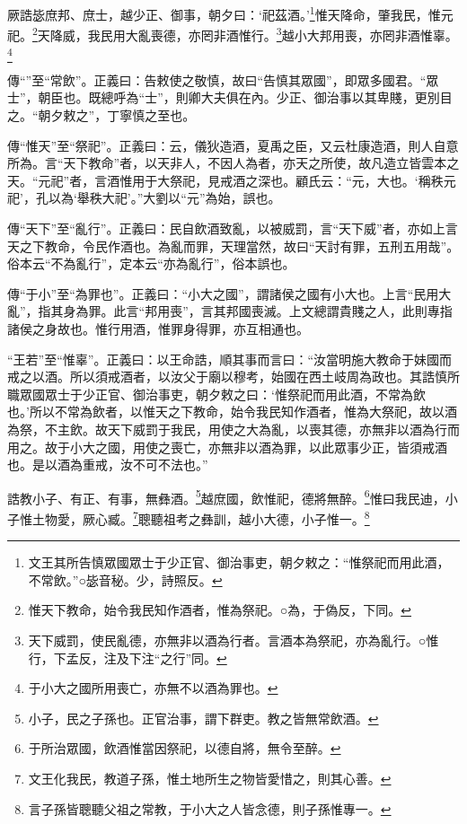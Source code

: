 厥誥毖庶邦、庶士，越少正、御事，朝夕曰：‘祀茲酒。’\footnote{文王其所告慎眾國眾士于少正官、御治事吏，朝夕敕之：“惟祭祀而用此酒，不常飲。”○毖音秘。少，詩照反。}惟天降命，肇我民，惟元祀。\footnote{惟天下教命，始令我民知作酒者，惟為祭祀。○為，于偽反，下同。}天降威，我民用大亂喪德，亦罔非酒惟行。\footnote{天下威罰，使民亂德，亦無非以酒為行者。言酒本為祭祀，亦為亂行。○惟行，下孟反，注及下注“之行”同。}越小大邦用喪，亦罔非酒惟辜。\footnote{于小大之國所用喪亡，亦無不以酒為罪也。}

{\noindent\zhuan{}\fzbyks 傳“”至“常飲”。正義曰：告敕使之敬慎，故曰“告慎其眾國”，即眾多國君。“眾士”，朝臣也。既總呼為“士”，則卿大夫俱在內。少正、御治事以其卑賤，更別目之。“朝夕敕之”，丁寧慎之至也。 \par}

{\noindent\zhuan{}\fzbyks 傳“惟天”至“祭祀”。正義曰：云，儀狄造酒，夏禹之臣，又云杜康造酒，則人自意所為。言“天下教命”者，以天非人，不因人為者，亦天之所使，故凡造立皆雲本之天。“元祀”者，言酒惟用于大祭祀，見戒酒之深也。顧氏云：“元，大也。‘稱秩元祀’，孔以為‘舉秩大祀’。”大劉以“元”為始，誤也。 \par}

{\noindent\zhuan{}\fzbyks 傳“天下”至“亂行”。正義曰：民自飲酒致亂，以被威罰，言“天下威”者，亦如上言天之下教命，令民作酒也。為亂而罪，天理當然，故曰“天討有罪，五刑五用哉”。俗本云“不為亂行”，定本云“亦為亂行”，俗本誤也。 \par}

{\noindent\zhuan{}\fzbyks 傳“于小”至“為罪也”。正義曰：“小大之國”，謂諸侯之國有小大也。上言“民用大亂”，指其身為罪。此言“邦用喪”，言其邦國喪滅。上文總謂貴賤之人，此則專指諸侯之身故也。惟行用酒，惟罪身得罪，亦互相通也。 \par}

{\noindent\shu{}\fzkt “王若”至“惟辜”。正義曰：以王命誥，順其事而言曰：“汝當明施大教命于妹國而戒之以酒。所以須戒酒者，以汝父于廟以穆考，始國在西土岐周為政也。其誥慎所職眾國眾士于少正官、御治事吏，朝夕敕之曰：‘惟祭祀而用此酒，不常為飲也。’所以不常為飲者，以惟天之下教命，始令我民知作酒者，惟為大祭祀，故以酒為祭，不主飲。故天下威罰于我民，用使之大為亂，以喪其德，亦無非以酒為行而用之。故于小大之國，用使之喪亡，亦無非以酒為罪，以此眾事少正，皆須戒酒也。是以酒為重戒，汝不可不法也。” \par}

誥教小子、有正、有事，無彝酒。\footnote{小子，民之子孫也。正官治事，謂下群吏。教之皆無常飲酒。}越庶國，飲惟祀，德將無醉。\footnote{于所治眾國，飲酒惟當因祭祀，以德自將，無令至醉。}惟曰我民迪，小子惟土物愛，厥心臧。\footnote{文王化我民，教道子孫，惟土地所生之物皆愛惜之，則其心善。}聰聽祖考之彝訓，越小大德，小子惟一。\footnote{言子孫皆聰聽父祖之常教，于小大之人皆念德，則子孫惟專一。}


